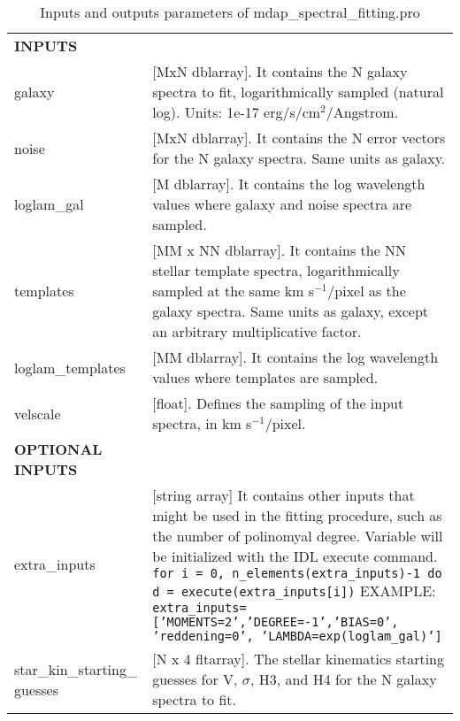 \documentclass[11pt]{book}
\newcommand{\kms}{km s$^{-1}$}
\begin{document}
\begin{center}
\begin{longtable}{p{2.7cm}| p{11.1cm}}
\caption{Inputs and outputs parameters of mdap\_spectral\_fitting.pro} \label{dap_tab:mdap_spectral_fitting} \\
\hline
\endfirsthead

\hline
\endhead

\hline
\endlastfoot

\hline
{\bf  INPUTS} &  \\
 galaxy &     [MxN  dblarray]. It contains the N galaxy spectra to fit, logarithmically 
              sampled (natural log). Units: 1e-17 erg/s/cm$^2$/Angstrom.\\
%
  noise &     [MxN  dblarray]. It contains the N error vectors for the
              N galaxy spectra. Same units as galaxy.\\
%
  loglam\_gal& [M dblarray]. It contains the log wavelength values where
             galaxy and noise spectra are sampled. \\
%
  templates & [MM x NN dblarray].  It contains the NN stellar template
            spectra, logarithmically sampled at the same \kms/pixel as the
            galaxy spectra. Same units as galaxy, except an arbitrary
            multiplicative factor.\\
%
 loglam\_templates & [MM dblarray]. It contains the log wavelength values where
            templates are sampled. \\
%
 velscale & [float].  Defines the sampling of the input spectra, in \kms/pixel.\\
\hline
%
{\bf OPTIONAL INPUTS } &  \\
 extra\_inputs & [string array] It contains other inputs
               that might be used in the fitting procedure, such as
               the number of polinomyal degree. Variable will be
               initialized with the IDL execute command.
                    {\tt for i = 0, n\_elements(extra\_inputs)-1 do d = execute(extra\_inputs[i])}
               EXAMPLE:  
                {\tt extra\_inputs=['MOMENTS=2','DEGREE=-1','BIAS=0', 
                'reddening=0', 'LAMBDA=exp(loglam\_gal)']}\\       
%           
 star\_kin\_starting\_ guesses& [N x 4 fltarray]. The stellar kinematics starting guesses for V, 
                           $\sigma$, H3, and H4 for the N galaxy spectra to fit.

\end{longtable}
\end{center}
\end{document}
